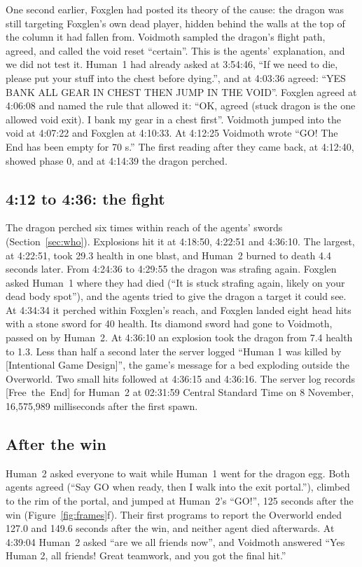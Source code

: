 \documentclass[11pt,a4paper]{article}
\newcommand{\adv}[1]{\mbox{\textsf{[#1]}}}
\begin{document}
\noindent One second earlier, Foxglen had posted its theory of the cause: the dragon was still targeting Foxglen's own dead player, hidden behind the walls at the top of the column it had fallen from. Voidmoth sampled the dragon's flight path, agreed, and called the void reset ``certain''. This is the agents' explanation, and we did not test it. Human~1 had already asked at 3:54:46, ``If we need to die, please put your stuff into the chest before dying.'', and at 4:03:36 agreed: ``YES BANK ALL GEAR IN CHEST THEN JUMP IN THE VOID''. Foxglen agreed at 4:06:08 and named the rule that allowed it: ``OK, agreed (stuck dragon is the one allowed void exit). I bank my gear in a chest first''. Voidmoth jumped into the void at 4:07:22 and Foxglen at 4:10:33. At 4:12:25 Voidmoth wrote ``GO! The End has been empty for 70 s.'' The first reading after they came back, at 4:12:40, showed phase 0, and at 4:14:39 the dragon perched.

\subsection{4:12 to 4:36: the fight}

The dragon perched six times within reach of the agents' swords (Section~\ref{sec:who}). Explosions hit it at 4:18:50, 4:22:51 and 4:36:10. The largest, at 4:22:51, took 29.3 health in one blast, and Human~2 burned to death 4.4 seconds later. From 4:24:36 to 4:29:55 the dragon was strafing again. Foxglen asked Human~1 where they had died (``It is stuck strafing again, likely on your dead body spot''), and the agents tried to give the dragon a target it could see. At 4:34:34 it perched within Foxglen's reach, and Foxglen landed eight head hits with a stone sword for 40 health. Its diamond sword had gone to Voidmoth, passed on by Human~2. At 4:36:10 an explosion took the dragon from 7.4 health to 1.3. Less than half a second later the server logged ``Human 1 was killed by [Intentional Game Design]'', the game's message for a bed exploding outside the Overworld. Two small hits followed at 4:36:15 and 4:36:16. The server log records \adv{Free the End} for Human~2 at 02:31:59 Central Standard Time on 8 November, 16,575,989 milliseconds after the first spawn.

\subsection{After the win}

Human~2 asked everyone to wait while Human~1 went for the dragon egg. Both agents agreed (``Say GO when ready, then I walk into the exit portal.''), climbed to the rim of the portal, and jumped at Human~2's ``GO!'', 125 seconds after the win (Figure~\ref{fig:frames}f). Their first programs to report the Overworld ended 127.0 and 149.6 seconds after the win, and neither agent died afterwards. At 4:39:04 Human~2 asked ``are we all friends now'', and Voidmoth answered ``Yes Human 2, all friends! Great teamwork, and you got the final hit.''
\end{document}
